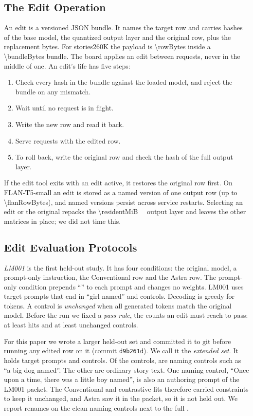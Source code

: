 \documentclass[conference,10pt,letterpaper]{IEEEtran}
\newcommand{\flan}{\mbox{FLAN-T5-small}}
\newcommand{\stories}{\mbox{stories260K}}
\begin{document}
\subsection{The Edit Operation}
An edit is a versioned JSON bundle. It names the target row and carries hashes of the base model, the quantized output layer and the original row, plus the replacement bytes. For \stories{} the payload is \SI{\rowBytes}{\byte} inside a \SI{\bundleBytes}{\byte} bundle. The board applies an edit between requests, never in the middle of one. An edit's life has five steps:
\begin{enumerate}
\item Check every hash in the bundle against the loaded model, and reject the bundle on any mismatch.
\item Wait until no request is in flight.
\item Write the new row and read it back.
\item Serve requests with the edited row.
\item To roll back, write the original row and check the hash of the full output layer.
\end{enumerate}
If the edit tool exits with an edit active, it restores the original row first. On \flan{} an edit is stored as a named version of one output row (up to \SI{\flanRowBytes}{\byte}), and named versions persist across service restarts. Selecting an edit or the original repacks the \SI{\residentMiB}{\mebi\byte} output layer and leaves the other matrices in place; we did not time this.

\subsection{Edit Evaluation Protocols}
\label{sec:protocols}
\emph{LM001} is the first held-out study. It has four conditions: the original model, a prompt-only instruction, the Conventional row and the Astra row. The prompt-only condition prepends ``\promptOnlyPrefix'' to each prompt and changes no weights. LM001 uses \lmTargets{} target prompts that end in ``girl named'' and \lmControls{} controls. Decoding is greedy for \lmMaxTokens{} tokens. A control is \emph{unchanged} when all \lmMaxTokens{} generated tokens match the original model. Before the run we fixed a \emph{pass rule}, the counts an edit must reach to pass: at least \lmMinHits{} hits and at least \lmMinControls{} unchanged controls.

For this paper we wrote a larger held-out set and committed it to git before running any edited row on it (commit \texttt{d9b261d}). We call it the \emph{extended set}. It holds \extTargets{} target prompts and \extControls{} controls. Of the controls, \extNaming{} are naming controls such as ``a big dog named''. The other \extOther{} are ordinary story text. One naming control, ``Once upon a time, there was a little boy named'', is also an authoring prompt of the LM001 packet. The Conventional and contrastive fits therefore carried constraints to keep it unchanged, and Astra saw it in the packet, so it is not held out. We report renames on the \extNamingClean{} clean naming controls next to the full \extNaming.
\end{document}
